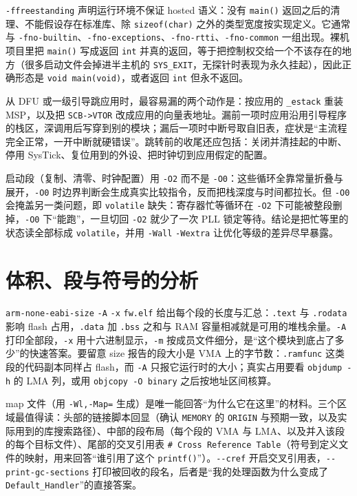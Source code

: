 \documentclass[12pt,a4paper,fontset=fandol]{ctexbook}
\newcommand{\Fn}[1]{\texttt{#1()}}
\newcommand{\Tp}[1]{\texttt{#1}}
\newcommand{\Opt}[1]{\texttt{-\/-#1}}
\begin{document}
\Tp{-ffreestanding} 声明运行环境不保证 hosted 语义：没有 \Fn{main} 返回之后的清理、不能假设存在标准库、除 \Tp{sizeof(char)} 之外的类型宽度按实现定义。它通常与 \Tp{-fno-builtin}、\Tp{-fno-exceptions}、\Tp{-fno-rtti}、\Tp{-fno-common} 一组出现。裸机项目里把 \Fn{main} 写成返回 \Tp{int} 并真的返回，等于把控制权交给一个不该存在的地方（很多启动文件会掉进半主机的 \Tp{SYS\_EXIT}，无探针时表现为永久挂起），因此正确形态是 \Tp{void main(void)}，或者返回 \Tp{int} 但永不返回。

\begin{warning}[title={bootloader 跳转后没重装栈指针与 \Tp{VTOR}}]
从 DFU 或一级引导跳应用时，最容易漏的两个动作是：按应用的 \Tp{\_estack} 重装 MSP，以及把 \Tp{SCB->VTOR} 改成应用的向量表地址。漏前一项时应用沿用引导程序的栈区，深调用后写穿到别的模块；漏后一项时中断号取自旧表，症状是``主流程完全正常，一开中断就硬错误''。跳转前的收尾还应包括：关闭并清挂起的中断、停用 SysTick、复位用到的外设、把时钟切到应用假定的配置。
\end{warning}

\begin{guideline}[title={启动代码的优化等级与 \Tp{volatile}}]
启动段（复制、清零、时钟配置）用 \Tp{-O2} 而不是 \Tp{-O0}：这些循环全靠常量折叠与展开，\Tp{-O0} 时边界判断会生成真实比较指令，反而把栈深度与时间都拉长。但 \Tp{-O0} 会掩盖另一类问题，即 \Tp{volatile} 缺失：寄存器忙等循环在 \Tp{-O2} 下可能被整段删掉，\Tp{-O0} 下``能跑''，一旦切回 \Tp{-O2} 就少了一次 PLL 锁定等待。结论是把忙等里的状态读全部标成 \Tp{volatile}，并用 \Tp{-Wall} \Tp{-Wextra} 让优化等级的差异尽早暴露。
\end{guideline}

\section{体积、段与符号的分析}

\label{sec:ch01-size}

\Tp{arm-none-eabi-size} \Tp{-A} \Tp{-x} \Tp{fw.elf} 给出每个段的长度与汇总：\Tp{.text} 与 \Tp{.rodata} 影响 flash 占用，\Tp{.data} 加 \Tp{.bss} 之和与 RAM 容量相减就是可用的堆栈余量。\Tp{-A} 打印全部段，\Tp{-x} 用十六进制显示，\Tp{-m} 按成员文件细分，是``这个模块到底占了多少''的快速答案。要留意 size 报告的段大小是 VMA 上的字节数：\Tp{.ramfunc} 这类段的代码副本同样占 flash，而 \Tp{-A} 只报它运行时的大小；真实占用要看 \Tp{objdump -h} 的 LMA 列，或用 \Tp{objcopy -O binary} 之后按地址区间核算。

map 文件（用 \Tp{-Wl,-Map=} 生成）是唯一能回答``为什么它在这里''的材料。三个区域最值得读：头部的链接脚本回显（确认 \Tp{MEMORY} 的 \Tp{ORIGIN} 与预期一致，以及实际用到的库搜索路径）、中部的段布局（每个段的 VMA 与 LMA、以及并入该段的每个目标文件）、尾部的交叉引用表 \Tp{\# Cross Reference Table}（符号到定义文件的映射，用来回答``谁引用了这个 \Fn{printf}''）。\Opt{cref} 开启交叉引用表，\Opt{print-gc-sections} 打印被回收的段名，后者是``我的处理函数为什么变成了 \Tp{Default\_Handler}''的直接答案。
\end{document}
